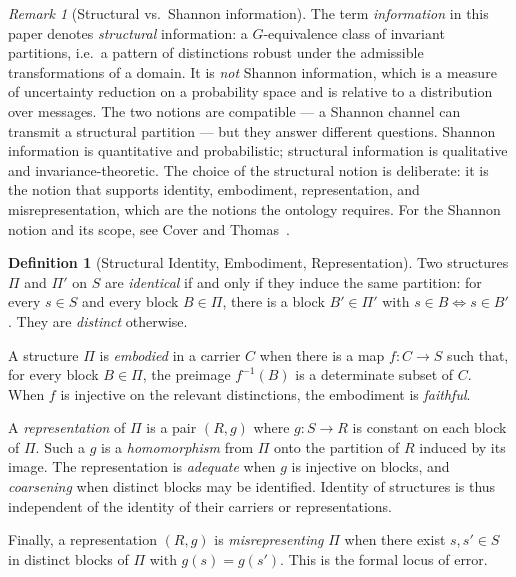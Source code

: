\documentclass[11pt,a4paper]{article}
\theoremstyle{definition}
\newtheorem{definition}{Definition}[section]
\theoremstyle{remark}
\newtheorem{remark}{Remark}[section]
\begin{document}
\begin{remark}[Structural vs.\ Shannon information]\label{rem:shannon}
The term \emph{information} in this paper denotes
\emph{structural} information: a $G$-equivalence class of invariant
partitions, i.e.\ a pattern of distinctions robust under the admissible
transformations of a domain. It is \emph{not} Shannon information,
which is a measure of uncertainty reduction on a probability space and
is relative to a distribution over messages. The two notions are
compatible --- a Shannon channel can transmit a structural partition
--- but they answer different questions. Shannon information is
quantitative and probabilistic; structural information is qualitative
and invariance-theoretic. The choice of the structural notion is
deliberate: it is the notion that supports identity, embodiment,
representation, and misrepresentation, which are the notions the
ontology requires. For the Shannon notion and its scope, see
Cover and Thomas~\cite{CoverThomas2006}.
\end{remark}

\begin{definition}[Structural Identity, Embodiment, Representation]
\label{def:identity}
Two structures $\Pi$ and $\Pi'$ on $S$ are \emph{identical} if and only
if they induce the same partition: for every $s \in S$ and every block
$B \in \Pi$, there is a block $B' \in \Pi'$ with $s \in B
\Leftrightarrow s \in B'$. They are \emph{distinct} otherwise.

A structure $\Pi$ is \emph{embodied} in a carrier $C$ when there is a
map $f : C \to S$ such that, for every block $B \in \Pi$, the preimage
$f^{-1}(B)$ is a determinate subset of $C$. When $f$ is injective on
the relevant distinctions, the embodiment is \emph{faithful}.

A \emph{representation} of $\Pi$ is a pair $(R, g)$ where $g : S \to R$
is constant on each block of $\Pi$. Such a $g$ is a
\emph{homomorphism} from $\Pi$ onto the partition of $R$ induced by its
image. The representation is \emph{adequate} when $g$ is injective on
blocks, and \emph{coarsening} when distinct blocks may be identified.
Identity of structures is thus independent of the identity of their
carriers or representations.

Finally, a representation $(R, g)$ is \emph{misrepresenting} $\Pi$ when
there exist $s, s' \in S$ in distinct blocks of $\Pi$ with
$g(s) = g(s')$. This is the formal locus of error.
\end{definition}
\end{document}
